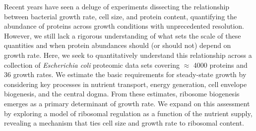 Recent years have seen a deluge of experiments dissecting the relationship
between bacterial growth rate, cell size, and protein content, quantifying
the abundance of proteins across growth conditions with unprecedented
resolution. However, we still lack a rigorous understanding of what sets the
scale of these quantities and when protein abundances should (or should not)
depend on growth rate. Here, we seek to quantitatively understand this
relationship across a collection of \textit{Escherichia coli} proteomic data
sets covering $\approx$ 4000 proteins and 36 growth rates. We estimate
the basic requirements for steady-state growth by considering key processes
in nutrient transport, energy generation, cell envelope biogenesis, and the
central dogma. From these estimates, ribosome biogenesis emerges as a primary
determinant of growth rate. We expand on this assessment by exploring a model of ribosomal
regulation as a function of the nutrient supply, revealing a mechanism that
ties cell size and growth rate to ribosomal content.
